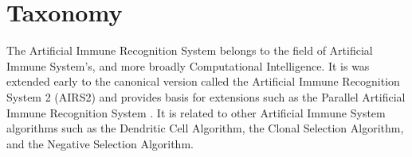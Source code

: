 \documentclass[a4paper, 11pt]{article}
\begin{document}
\section{Taxonomy}
\label{sec:taxonomy}
The Artificial Immune Recognition System belongs to the field of Artificial Immune System's, and more broadly Computational Intelligence.
It is was extended early to the canonical version called the  Artificial Immune Recognition System 2 (AIRS2) and provides basis for extensions such as the Parallel Artificial Immune Recognition System \cite{Watkins2004}.
It is related to other Artificial Immune System algorithms such as the Dendritic Cell Algorithm, the Clonal Selection Algorithm, and the Negative Selection Algorithm.

\end{document}
